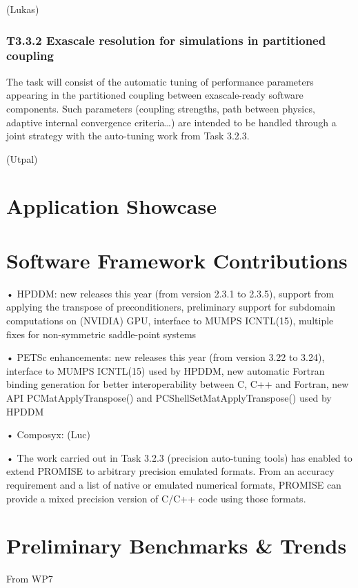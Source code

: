 (Lukas) 

\subsubsection{ 
T3.3.2 Exascale resolution for simulations in partitioned coupling
}
 The task will consist of the
automatic tuning of performance parameters appearing in the partitioned coupling between
exascale-ready software components. Such parameters (coupling strengths, path between physics,
adaptive internal convergence criteria…) are intended to be handled through a joint strategy with the
auto-tuning work from Task 3.2.3.

 (Utpal)


\section{Application Showcase}
%   

\section{Software Framework Contributions}
 • HPDDM: new releases this year (from version 2.3.1 to 2.3.5), support from applying the transpose of preconditioners, preliminary support for subdomain computations on (NVIDIA) GPU, interface to MUMPS ICNTL(15), multiple fixes for non-symmetric saddle-point systems
 
 • PETSc enhancements: new releases this year (from version 3.22 to 3.24), interface to MUMPS ICNTL(15) used by HPDDM, new automatic Fortran binding generation for better interoperability between C, C++ and Fortran, new API PCMatApplyTranspose() and PCShellSetMatApplyTranspose() used by HPDDM
 
 • Composyx: (Luc)
 
 • %
The work carried out in Task 3.2.3 (precision auto-tuning tools) has enabled to extend PROMISE to arbitrary precision emulated formats. 
From an accuracy requirement and a list of native or emulated numerical formats, PROMISE can provide a mixed precision version of C/C++ code using those formats.

\section{Preliminary Benchmarks \& Trends}
From WP7 

